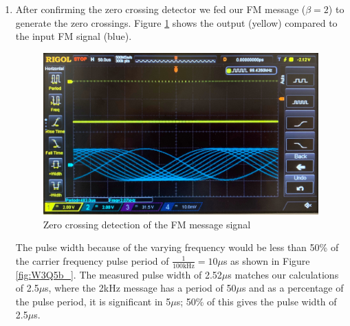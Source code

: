\documentclass[11pt]{article}
\begin{document}
\begin{enumerate}[label=(\alph*)]
\item %
After confirming the zero crossing detector we fed our FM message ($\beta=2$) to generate the zero crossings. Figure \ref{fig:W3Q5b_a} shows the output (yellow) compared to the input FM signal (blue). 
\begin{figure}[H]
    \centering
    \includegraphics[width=15cm]{W3Q5b_a.jpg}
    \caption{Zero crossing detection of the FM message signal}
    \label{fig:W3Q5b_a}
\end{figure}
The pulse width because of the varying frequency would be less than 50\% of the carrier frequency pulse period of $\frac{1}{100\text{kHz}} = 10\mu$s as shown in Figure \ref{fig:W3Q5b_}. The measured pulse width of 2.52$\mu$s matches our calculations of 2.5$\mu$s, where the 2kHz message has a period of 50$\mu$s and as a percentage of the pulse period, it is significant in 5$\mu$s; 50\% of this gives the pulse width of 2.5$\mu$s.



\end{enumerate}
\end{document}
